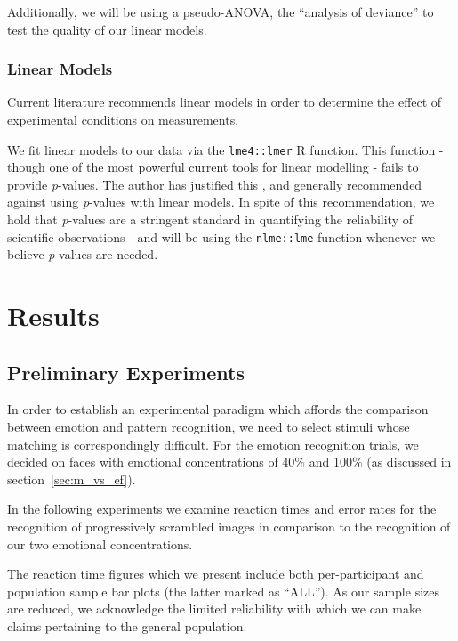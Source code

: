 	    Additionally, we will be using a pseudo-ANOVA, the “analysis of deviance” \cite{Hastie1992} to test the quality of our linear models. 
	\subsection{Linear Models}\label{sec:m_sa_lm}
	    Current literature \cite{Baayen2008} recommends linear models in order to determine the effect of experimental conditions on measurements.
	    
	    We fit linear models to our data via the \colorbox{vlg}{\texttt{lme4::lmer}} \cite{Bates2005,Bates2007} R function.
	    This function - though one of the most powerful current tools for linear modelling - fails to provide \textit{p}-values.
	    The author has justified this \cite{Bates2006}, and generally recommended against using \textit{p}-values with linear models.
	    In spite of this recommendation, we hold that \textit{p}-values are a stringent standard in quantifying the reliability of scientific observations -
	    and will be using the \colorbox{vlg}{\texttt{nlme::lme}} \cite{Pinheiro2013} function whenever we believe \textit{p}-values are needed.
\chapter{Results}                                                                          
    \section{Preliminary Experiments}\label{sec:r_pe}
	In order to establish an experimental paradigm which affords the comparison between emotion and pattern recognition, we need to select stimuli whose matching is correspondingly difficult.
	For the emotion recognition trials, we decided on faces with emotional concentrations of 40\% and 100\% (as discussed in section~\ref{sec:m_vs_ef}).
	
	In the following experiments we examine reaction times and error rates for the recognition of progressively scrambled images in comparison to the recognition of our two emotional concentrations.
	
	The reaction time figures which we present include both per-participant and population sample bar plots (the latter marked as “ALL”).
	As our sample sizes are reduced, we acknowledge the limited reliability with which we can make claims pertaining to the general population. 
	
